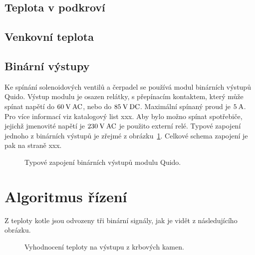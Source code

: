 \documentclass[a4paper,draft]{book}
\begin{document}
    \section{Teplota v podkroví}

    \section{Venkovní teplota}

    \section{Binární výstupy}

        Ke spínání solenoidových ventilů a čerpadel se používá modul binárních
        výstupů Quido. Výstup modulu je
        osazen relátky, s přepínacím kontaktem, který může spínat napětí do
        $60\rm\:V\:AC$, nebo do $85\rm\:V\:DC$. Maximální spínaný proud je
        $5\rm\:A$. Pro více informací viz katalogový list xxx. Aby bylo možno
        spínat spotřebiče, jejichž jmenovité napětí je $230\rm\:V\:AC$ je
        použito externí relé. Typové zapojení jednoho z binárních výstupů je
        zřejmé z obrázku~\ref{fig:binary-out}. Celkové schema zapojení je pak
        na straně xxx.

        \begin{figure}\centering
            \begin{tikzpicture}
                
            \end{tikzpicture}
            \caption{Typové zapojení binárních výstupů modulu Quido.}
            \label{fig:binary-out}
        \end{figure}

        \cite{da2rs}

    \chapter{Algoritmus řízení}\label{chap:algorithm}

        Z teploty kotle jsou odvozeny tři binární signály, jak je vidět z
        následujícího obrázku.

        \begin{figure}
            \begin{tikzpicture}
                
            \end{tikzpicture}
            \caption{Vyhodnocení teploty na výstupu z krbových kamen.}
        \end{figure}
\end{document}
